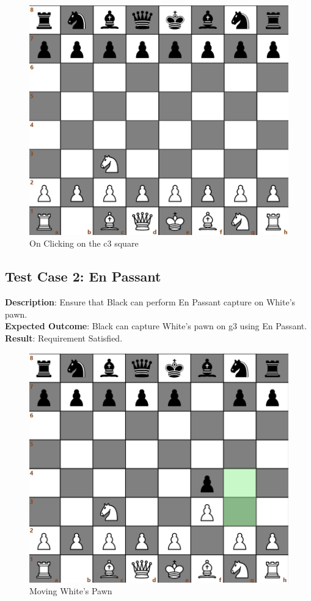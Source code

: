 \documentclass[a4paper,12pt]{article}
\begin{document}
\begin{figure}[H]
    \centering
    \includegraphics[width=0.6\linewidth]{Images/Test Cases/testCase1Img2.png}
    \caption{On Clicking on the c3 square}
    \label{fig:AfterKnightMove}
\end{figure}

\subsection{Test Case 2: En Passant}
\textbf{Description}: Ensure that Black can perform En Passant capture on White's pawn.\\
\textbf{Expected Outcome}: Black can capture White's pawn on g3 using En Passant.\\
\textbf{Result}: Requirement Satisfied.

\begin{figure}[H]
    \centering
    \includegraphics[width=0.6\linewidth]{Images/Test Cases/testCase2Img1.png}
    \caption{Moving White's Pawn}
    \label{fig:WhiteMove}
\end{figure}
\end{document}

